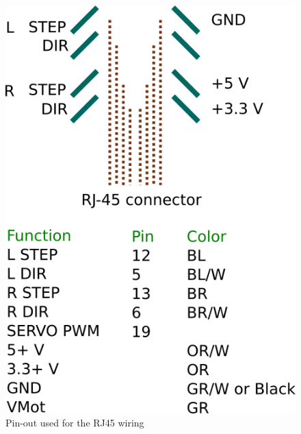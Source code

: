 \documentclass[a4paper,10pt]{article}
\begin{document}
\begin{figure}[h!]
  \centering
  \includegraphics[scale=.75]{img/pinout.png}
  \caption{Pin-out used for the RJ45 wiring}
  \label{fig:pinout}
\end{figure}

\end{document}
